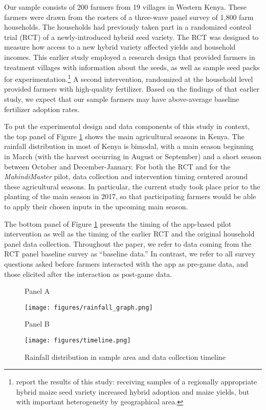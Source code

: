 \documentclass[12pt,letterpaper]{article}
\begin{document}
Our sample consists of 200 farmers from 19 villages in Western Kenya. These farmers were drawn from the rosters of a three-wave panel survey of 1,800 farm households. The households had previously taken part in a randomized control trial (RCT) of a newly-introduced hybrid seed variety. The RCT was designed to measure how access to a new hybrid variety affected yields and household incomes. This earlier study employed a research design that provided farmers in treatment villages with information about the seeds, as well as sample seed packs for experimentation.\footnote{\cite{niche_carter_2019} report the results of this study: receiving samples of a regionally appropriate hybrid maize seed variety increased hybrid adoption and maize yields, but with important heterogeneity by geographical area.} A second intervention, randomized at the household level provided farmers with high-quality fertilizer. Based on the findings of that earlier study, we expect that our sample farmers may have above-average baseline fertilizer adoption rates.

To put the experimental design and data components of this study in context, the top panel of Figure \ref{fig:rainfall} shows the main agricultural seasons in Kenya. The rainfall distribution in most of Kenya is bimodal, with a main season beginning in March (with the harvest occurring in August or September) and a short season between October and December-January. For both the RCT and for the \textit{MahindiMaster} pilot, data collection and intervention timing centered around these agricultural seasons. In particular, the current study took place prior to the planting of the main season in 2017, so that  participating farmers would be able to apply their chosen inputs in the upcoming main season. 

The bottom panel of Figure \ref{fig:rainfall} presents the timing of the app-based pilot intervention as well as the timing of the earlier RCT and the original household panel data collection. Throughout the paper, we refer to data coming from the RCT panel baseline survey as ``baseline data.'' In contrast, we refer to all survey questions asked before farmers interacted with the app as pre-game data, and those elicited after the interaction as post-game data.

\begin{figure} 
\vspace{-1cm}
\centering Panel A 
\hspace*{-.3cm}\centerline{\texttt{[image: figures/rainfall\_graph.png]}} \par 
\centering Panel B
\centerline{\texttt{[image: figures/timeline.png]}}
\caption{Rainfall distribution in sample area and data collection timeline} \label{fig:rainfall}
\end{figure}
\end{document}
